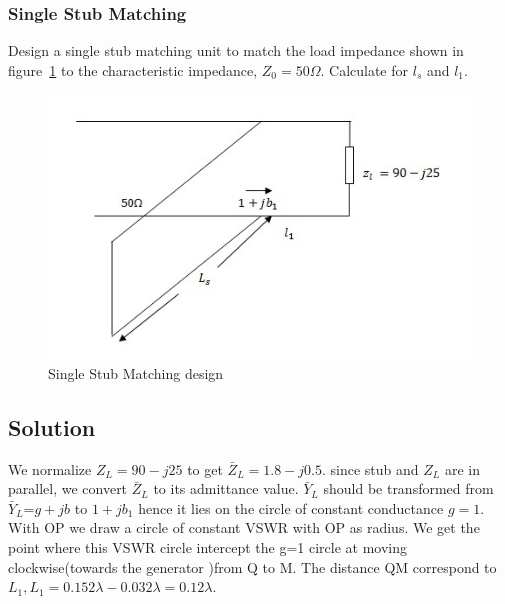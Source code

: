 \begin{exmp}
\subsubsection*{Single Stub Matching}
Design a single stub matching unit to match the load impedance shown in figure~\ref{fig:figw} to the characteristic impedance, $Z_0 = 50\varOmega$. Calculate for $l_s$ and $l_1$.
\begin{figure}[h]
\centering
\includegraphics[width=1\linewidth]{./graphics/figw}
\caption{Single Stub Matching design}
\label{fig:figw}
\end{figure}

\subsection*{Solution}
We normalize $Z_L=90-j25$ to get 
$\bar{Z}_L=1.8-j0.5$. since stub and $Z_L$ are in parallel,
we convert $\bar{Z}_L$ to its admittance value. $\bar{Y}_{L}$
should be transformed from 
$\bar{Y}_{L}$=$g+jb$ to $1+jb_1$ hence it lies on the circle of constant conductance $g=1$. With OP we draw a circle of constant VSWR with OP as radius. We get the point where this VSWR circle intercept the g=1 circle at moving clockwise(towards the generator )from Q to M. The distance QM correspond to $L_1, L_1=0.152\lambda-0.032\lambda=0.12\lambda$.


\end{exmp}

